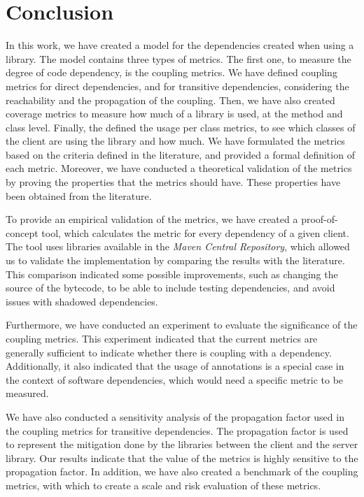 \chapter{Conclusion}\label{ch:Conclusion}

In this work, we have created a model for the dependencies created when using a library. The model contains three types of metrics. The first one, to measure the degree of code dependency, is the coupling metrics. We have defined coupling metrics for direct dependencies, and for transitive dependencies, considering the reachability and the propagation of the coupling. Then, we have also created coverage metrics to measure how much of a library is used, at the method and class level. Finally, the defined the usage per class metrics, to see which classes of the client are using the library and how much. We have formulated the metrics based on the criteria defined in the literature, and provided a formal definition of each metric. Moreover, we have conducted a theoretical validation of the metrics by proving the properties that the metrics should have. These properties have been obtained from the literature.

To provide an empirical validation of the metrics, we have created a proof-of-concept tool, which calculates the metric for every dependency of a given client. The tool uses libraries available in the \textit{Maven Central Repository}, which allowed us to validate the implementation by comparing the results with the literature. This comparison indicated some possible improvements, such as changing the source of the bytecode, to be able to include testing dependencies, and avoid issues with shadowed dependencies.

Furthermore, we have conducted an experiment to evaluate the significance of the coupling metrics. This experiment indicated that the current metrics are generally sufficient to indicate whether there is coupling with a dependency. Additionally, it also indicated that the usage of annotations is a special case in the context of software dependencies, which would need a specific metric to be measured.

We have also conducted a sensitivity analysis of the propagation factor used in the coupling metrics for transitive dependencies. The propagation factor is used to represent the mitigation done by the libraries between the client and the server library. Our results indicate that the value of the metrics is highly sensitive to the propagation factor. In addition, we have also created a benchmark of the coupling metrics, with which to create a scale and risk evaluation of these metrics.

